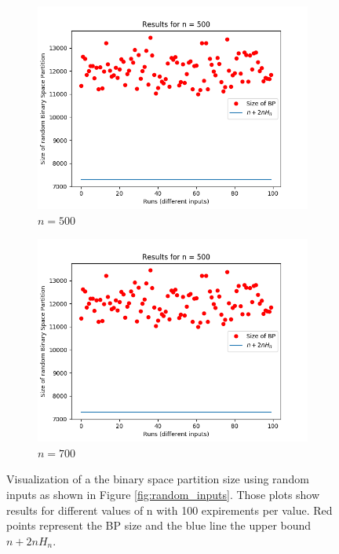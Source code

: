 \documentclass[letterpaper]{article}
\begin{document}
\begin{figure}[H]
\begin{subfigure}{.33\textwidth}
      \includegraphics[width=1\linewidth]{images/assign1/random/inputs_500}
      \caption{$n = 500$}
    \end{subfigure}
    \begin{subfigure}{.33\textwidth}
      \centering
      \includegraphics[width=1\linewidth]{images/assign1/random/inputs_500}
      \caption{$n = 700$}
    \end{subfigure}
    \caption{Visualization of a the binary space partition size using
    random inputs as shown in Figure \ref{fig:random_inputs}.
    Those plots show results for
    different values of n with 100 expirements per value. Red points represent
    the BP size and the blue line the upper bound $n + 2nH_n$.}
    \label{fig:expirements_random}
\end{figure}
\end{document}
